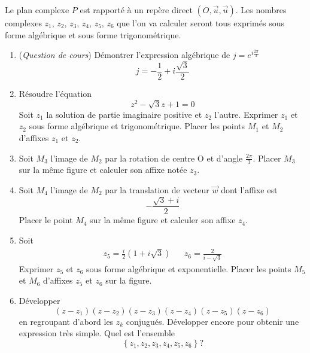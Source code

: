 Le plan complexe $P$ est rapporté à un repère direct $(O,\overrightarrow{u},\overrightarrow{u})$.\newline
Les nombres complexes $z_1$, $z_2$, $z_3$, $z_4$, $z_5$, $z_6$ que l'on va calculer seront tous exprimés sous forme algébrique et sous forme trigonométrique.
\begin{enumerate}
\item (\emph{Question de cours}) Démontrer l'expression algébrique de $j=e^{i\frac{2\pi}{3}}$
\begin{displaymath}
 j = -\dfrac{1}{2}+i\dfrac{\sqrt{3}}{2}
\end{displaymath}

\item Résoudre l'équation
\[z^2 - \sqrt{3} z +1 = 0\]
Soit $z_1$ la solution de partie imaginaire positive et $z_2$ l'autre. Exprimer $z_1$ et $z_2$ sous forme algébrique et trigonométrique. Placer les points $M_1$ et $M_2$ d'affixes $z_1$ et $z_2$.

\item Soit $M_3$ l'image de $M_2$ par la rotation de centre O et d'angle $\frac{2\pi}{3} $. Placer $M_3$ sur la même figure et calculer son affixe notée $z_3$.

\item Soit $M_4$ l'image de $M_2$ par la translation de vecteur $\overrightarrow{w}$ dont l'affixe est
\[-\frac{\sqrt{3}+i}{2}\]
Placer le point $M_4$ sur la même figure et calculer son affixe $z_4$.

\item Soit
\begin{align*}
z_5=\frac{i}{2}(1+i\sqrt{3}) & &  z_6 = \frac{2}{i-\sqrt{3}} 
\end{align*}
Exprimer $z_5$ et $z_6$ sous forme algébrique et exponentielle. Placer les points $M_5$ et $M_6$ d'affixes $z_5$ et $z_6$ sur la figure.

\item Développer
\[(z-z_1)(z-z_2)(z-z_3)(z-z_4)(z-z_5)(z-z_6)\]
en regroupant d'abord les $z_k$ conjugués. Développer encore pour obtenir une expression très simple. Quel est l'ensemble
\begin{displaymath}
 \left\lbrace z_1,z_2,z_3,z_4,z_5,z_6\right\rbrace  ?
\end{displaymath}

\end{enumerate}

